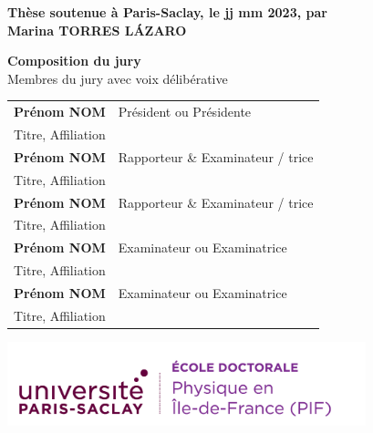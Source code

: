 \documentclass[french,12pt,a4paper]{book}
\begin{document}
\begin{titlepage}
\textbf{Thèse soutenue à Paris-Saclay, le jj mm 2023, par}\\
\bigskip
\Large {\color{Prune} \textbf{Marina TORRES LÁZARO}} %

\vspace{\fill} %

\bigskip

\flushleft
\small {\color{Prune} \textbf{Composition du jury}}\\
{\color{Prune} \scriptsize {Membres du jury avec voix délibérative}} \\
\vspace{2mm}
\scriptsize
\begin{tabular}{|p{7cm}l}
\arrayrulecolor{Prune}
\textbf{Prénom NOM} &   Président ou Présidente\\ 
Titre, Affiliation & \\
\textbf{Prénom NOM} &  Rapporteur \& Examinateur / trice \\ 
Titre, Affiliation   &   \\ 
\textbf{Prénom NOM} &  Rapporteur \& Examinateur / trice \\ 
Titre, Affiliation  &   \\ 
\textbf{Prénom NOM} &  Examinateur ou Examinatrice \\ 
Titre, Affiliation   &   \\ 
\textbf{Prénom NOM} &  Examinateur ou Examinatrice \\ 
Titre, Affiliation   &   \\ 
 

\end{tabular} 

\end{titlepage}


\thispagestyle{empty}
\selectfont

\lhead{}
\rhead{}
\rfoot{}
\cfoot{}
\lfoot{}

\noindent 
\includegraphics[height=2.45cm]{logo_usp_PIF.png}
\vspace{1cm}
\selectfont
\end{document}
